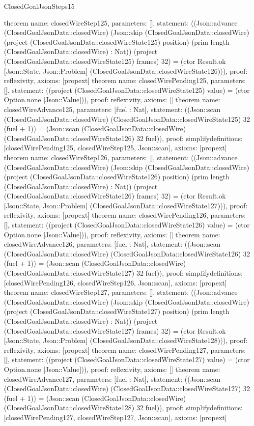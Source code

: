 \begin{lexlean}{ClosedGoalJsonSteps15}
\begin{semanticmodule}
{}
theorem{
 name: closedWireStep125, parameters: [],
 statement: ((Json::advance (ClosedGoalJsonData::closedWire) (Json::skip (ClosedGoalJsonData::closedWire) (project (ClosedGoalJsonData::closedWireState125) position) (prim length (ClosedGoalJsonData::closedWire) : Nat)) (project (ClosedGoalJsonData::closedWireState125) frames) 32) = (ctor Result.ok [Json::State, Json::Problem] (ClosedGoalJsonData::closedWireState126))), proof: reflexivity{}, axioms: [propext]
}
theorem{
 name: closedWirePending125, parameters: [],
 statement: ((project (ClosedGoalJsonData::closedWireState125) value) = (ctor Option.none [Json::Value])), proof: reflexivity{}, axioms: []
}
theorem{
 name: closedWireAdvance125, parameters: [fuel : Nat],
 statement: ((Json::scan (ClosedGoalJsonData::closedWire) (ClosedGoalJsonData::closedWireState125) 32 (fuel + 1)) = (Json::scan (ClosedGoalJsonData::closedWire) (ClosedGoalJsonData::closedWireState126) 32 fuel)), proof: simplify{definitions: [closedWirePending125, closedWireStep125, Json::scan]}, axioms: [propext]
}
theorem{
 name: closedWireStep126, parameters: [],
 statement: ((Json::advance (ClosedGoalJsonData::closedWire) (Json::skip (ClosedGoalJsonData::closedWire) (project (ClosedGoalJsonData::closedWireState126) position) (prim length (ClosedGoalJsonData::closedWire) : Nat)) (project (ClosedGoalJsonData::closedWireState126) frames) 32) = (ctor Result.ok [Json::State, Json::Problem] (ClosedGoalJsonData::closedWireState127))), proof: reflexivity{}, axioms: [propext]
}
theorem{
 name: closedWirePending126, parameters: [],
 statement: ((project (ClosedGoalJsonData::closedWireState126) value) = (ctor Option.none [Json::Value])), proof: reflexivity{}, axioms: []
}
theorem{
 name: closedWireAdvance126, parameters: [fuel : Nat],
 statement: ((Json::scan (ClosedGoalJsonData::closedWire) (ClosedGoalJsonData::closedWireState126) 32 (fuel + 1)) = (Json::scan (ClosedGoalJsonData::closedWire) (ClosedGoalJsonData::closedWireState127) 32 fuel)), proof: simplify{definitions: [closedWirePending126, closedWireStep126, Json::scan]}, axioms: [propext]
}
theorem{
 name: closedWireStep127, parameters: [],
 statement: ((Json::advance (ClosedGoalJsonData::closedWire) (Json::skip (ClosedGoalJsonData::closedWire) (project (ClosedGoalJsonData::closedWireState127) position) (prim length (ClosedGoalJsonData::closedWire) : Nat)) (project (ClosedGoalJsonData::closedWireState127) frames) 32) = (ctor Result.ok [Json::State, Json::Problem] (ClosedGoalJsonData::closedWireState128))), proof: reflexivity{}, axioms: [propext]
}
theorem{
 name: closedWirePending127, parameters: [],
 statement: ((project (ClosedGoalJsonData::closedWireState127) value) = (ctor Option.none [Json::Value])), proof: reflexivity{}, axioms: []
}
theorem{
 name: closedWireAdvance127, parameters: [fuel : Nat],
 statement: ((Json::scan (ClosedGoalJsonData::closedWire) (ClosedGoalJsonData::closedWireState127) 32 (fuel + 1)) = (Json::scan (ClosedGoalJsonData::closedWire) (ClosedGoalJsonData::closedWireState128) 32 fuel)), proof: simplify{definitions: [closedWirePending127, closedWireStep127, Json::scan]}, axioms: [propext]
}
\end{semanticmodule}
\end{lexlean}
